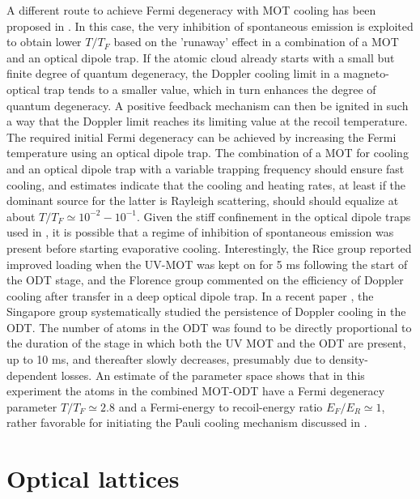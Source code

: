 \documentclass[pra,letterpaper,twocolumn,showpacs,superscriptaddress]{revtex4}
\begin{document}
A different route to achieve Fermi degeneracy with MOT cooling has been proposed in \cite{Onofrio2016}.  
In this case, the very inhibition of spontaneous emission is exploited to obtain lower $T/T_F$ based on the 'runaway' effect in a combination of a MOT  
and an optical dipole trap. If the atomic cloud already starts with a small but finite degree of quantum degeneracy, the Doppler cooling limit in a magneto-optical trap 
tends to a smaller value, which in turn enhances the degree of quantum degeneracy. A positive feedback mechanism can then be ignited in such a way 
that the Doppler limit reaches its limiting value at the recoil temperature. 
The required initial Fermi degeneracy can be achieved by increasing the Fermi temperature using an optical dipole trap. 
The combination of a MOT for cooling and an optical dipole trap with a variable trapping frequency should ensure fast 
cooling, and estimates indicate that the cooling and heating rates, at least if the dominant source for the latter is Rayleigh scattering, should 
should equalize at about $T/T_F \simeq 10^{-2}-10^{-1}$. Given the stiff confinement in the optical dipole traps used in \cite{Duarte2011,Burchianti2014}, 
it is possible that a regime of inhibition of spontaneous emission was present before starting evaporative cooling. Interestingly, the Rice group 
reported improved loading when the UV-MOT was kept on for 5 ms following the start of the ODT stage, and the Florence group 
commented on the efficiency of Doppler cooling after transfer in a deep optical dipole trap. In a recent paper \cite{Gross2016}, the Singapore group  
systematically studied the persistence of Doppler cooling in the ODT. The number of atoms in the ODT was found to be directly proportional to the duration of the 
stage in which both the UV MOT and the ODT are present, up to 10 ms, and thereafter slowly decreases, presumably due to density-dependent losses. An estimate of 
the parameter space shows that in this experiment the atoms in the combined MOT-ODT have a Fermi degeneracy parameter $T/T_F \simeq 2.8$ and a 
Fermi-energy to recoil-energy ratio $E_F/E_R \simeq 1$, rather favorable for initiating the Pauli cooling mechanism discussed in \cite{Onofrio2016}.

\section{Optical lattices}
\end{document}
